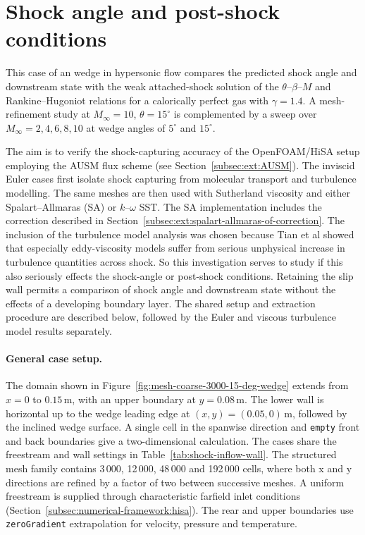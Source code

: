 \section{Shock angle and post-shock conditions}
\label{sec:numerical-vv:shock-angle-post-shock}

This case of an wedge in hypersonic flow compares the predicted shock angle and downstream state with the weak attached-shock solution of the \(\theta\)--\(\beta\)--\(M\) and
Rankine--Hugoniot relations for a calorically perfect gas with \(\gamma=1.4\).
A mesh-refinement study at \(M_\infty=10\), \(\theta=15^\circ\) is complemented
by a sweep over \(M_\infty=2,4,6,8,10\) at wedge angles of \(5^\circ\) and
\(15^\circ\).
\par\medskip

The aim is to verify the shock-capturing accuracy of the OpenFOAM/HiSA setup
employing the AUSM flux scheme (see Section~\ref{subsec:ext:AUSM}). The inviscid
Euler cases first isolate shock capturing from molecular transport and turbulence
modelling. The same meshes are then used with Sutherland viscosity and either
Spalart--Allmaras (SA) or \(k\)--\(\omega\) SST. The SA implementation includes
the correction described in Section~\ref{subsec:ext:spalart-allmaras-of-correction}. The inclusion of the turbulence model analysis was chosen because Tian et al \cite{tian2023correction} showed that especially eddy-viscosity models suffer from serious unphysical increase in turbulence quantities across shock. So this investigation serves to study if this also seriously effects the shock-angle or post-shock conditions. Retaining the slip wall permits a comparison of shock angle and downstream state without the effects of a developing boundary layer. The shared setup and extraction procedure are described below, followed by the Euler and viscous turbulence model results separately.

\paragraph{General case setup.}

The domain shown in Figure~\ref{fig:mesh-coarse-3000-15-deg-wedge}
extends from \(x=0\) to \(0.15\,\mathrm{m}\), with an upper boundary at
\(y=0.08\,\mathrm{m}\). The lower wall is horizontal up to the wedge leading
edge at \((x,y)=(0.05,0)\,\mathrm{m}\), followed by the inclined wedge surface.
A single cell in the spanwise direction and \texttt{empty} front and back
boundaries give a two-dimensional calculation. The cases share the freestream
and wall settings in Table~\ref{tab:shock-inflow-wall}. The structured mesh family
contains 3\,000, 12\,000, 48\,000 and 192\,000 cells, where both x and y directions
are refined by a factor of two between successive meshes. A uniform freestream is supplied through characteristic farfield inlet conditions (Section~\ref{subsec:numerical-framework:hisa}). The rear and upper boundaries use \texttt{zeroGradient} extrapolation for velocity, pressure and temperature.

